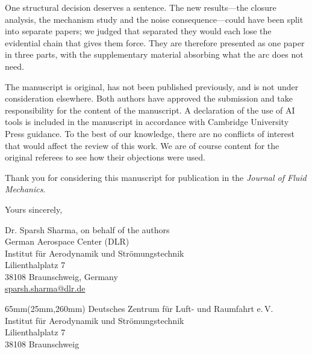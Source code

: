 \documentclass[11pt,a4paper]{article}
\makeatletter
\newcommand{\Institute}{Institut für Aerodynamik und Strömungstechnik}
\newcommand{\Email}{sparsh.sharma@dlr.de}
\newcommand{\ClosingName}{Dr. Sparsh Sharma}
\makeatother
\begin{document}
\vspace{5mm}

One structural decision deserves a sentence. The new results---the
closure analysis, the mechanism study and the noise consequence---could
have been split into separate papers; we judged that separated they
would each lose the evidential chain that gives them force. They are
therefore presented as one paper in three parts, with the supplementary
material absorbing what the arc does not need.

\vspace{5mm}

The manuscript is original, has not been published previously, and is
not under consideration elsewhere. Both authors have approved the
submission and take responsibility for the content of the manuscript. A
declaration of the use of AI tools is included in the manuscript in
accordance with Cambridge University Press guidance. To the best of our
knowledge, there are no conflicts of interest that would affect the
review of this work. We are of course content for the original referees
to see how their objections were used.

\vspace{5mm}

Thank you for considering this manuscript for publication in the
\textit{Journal of Fluid Mechanics}.

\vspace{10mm}

Yours sincerely,

\vspace{18mm}

\ClosingName, on behalf of the authors\\
German Aerospace Center (DLR)\\
\Institute\\
Lilienthalplatz 7\\
38108 Braunschweig, Germany\\
\href{mailto:\Email}{\Email}

\begin{textblock*}{65mm}(25mm,260mm)
  \scriptsize
  Deutsches Zentrum für Luft- und Raumfahrt e.\,V.\\
  Institut für Aerodynamik und Strömungstechnik\\
  Lilienthalplatz 7\\
  38108 Braunschweig
\end{textblock*}
\end{document}
